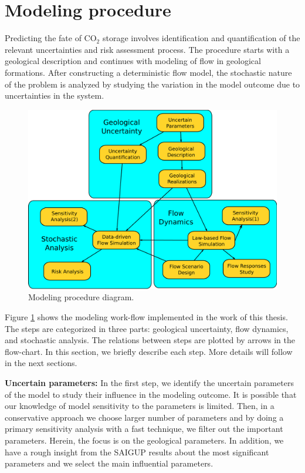 \section{Modeling procedure}
\label{sec:ModelingProcedure}

Predicting the fate of $\mbox{CO}_2$ storage involves identification and
quantification of the  relevant uncertainties and risk assessment process. The
procedure starts with a geological description and continues with modeling of
flow in geological formations. After constructing a deterministic flow model,
the stochastic nature of the problem is analyzed by studying the variation in
the model outcome due to uncertainties in the system. 

\begin{figure}
  \center
  \includegraphics[width=0.95 \linewidth]{./figurer/prc3}
  \caption{Modeling procedure diagram.}
  \label{fig:prc}
%
\end{figure}

Figure \ref{fig:prc} shows the modeling work-flow implemented in the work of
this thesis. The steps are categorized in three parts: geological uncertainty,
flow dynamics, and stochastic analysis. The relations between steps are plotted
by arrows in the flow-chart. In this section, we briefly describe each step.
More details will follow in the next sections.

\textbf{Uncertain parameters:} In the first step, we identify the uncertain
parameters of the model  to study their influence in the modeling outcome. It is
possible that our knowledge of model sensitivity to the parameters is limited.
Then, in a conservative approach we choose larger number of parameters and by
doing a primary sensitivity analysis with a fast technique, we filter out the
important parameters. Herein, the focus is on the geological parameters. In
addition, we have a rough insight from the SAIGUP results about the most
significant parameters and we select the main influential parameters.

